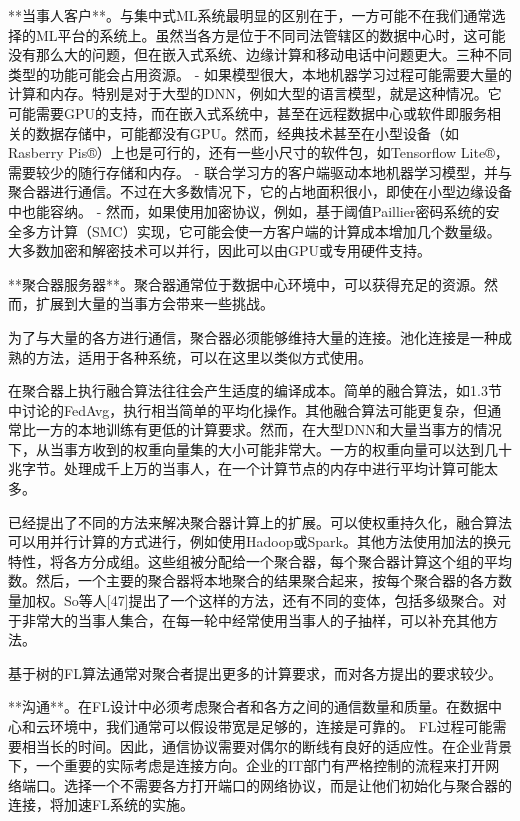 **当事人客户**。与集中式ML系统最明显的区别在于，一方可能不在我们通常选择的ML平台的系统上。虽然当各方是位于不同司法管辖区的数据中心时，这可能没有那么大的问题，但在嵌入式系统、边缘计算和移动电话中问题更大。三种不同类型的功能可能会占用资源。
- 如果模型很大，本地机器学习过程可能需要大量的计算和内存。特别是对于大型的DNN，例如大型的语言模型，就是这种情况。它可能需要GPU的支持，而在嵌入式系统中，甚至在远程数据中心或软件即服务相关的数据存储中，可能都没有GPU。然而，经典技术甚至在小型设备（如Rasberry Pis®）上也是可行的，还有一些小尺寸的软件包，如Tensorflow Lite®，需要较少的随行存储和内存。
- 联合学习方的客户端驱动本地机器学习模型，并与聚合器进行通信。不过在大多数情况下，它的占地面积很小，即使在小型边缘设备中也能容纳。
- 然而，如果使用加密协议，例如，基于阈值Paillier密码系统的安全多方计算（SMC）实现，它可能会使一方客户端的计算成本增加几个数量级。大多数加密和解密技术可以并行，因此可以由GPU或专用硬件支持。

**聚合器服务器**。聚合器通常位于数据中心环境中，可以获得充足的资源。然而，扩展到大量的当事方会带来一些挑战。

为了与大量的各方进行通信，聚合器必须能够维持大量的连接。池化连接是一种成熟的方法，适用于各种系统，可以在这里以类似方式使用。

在聚合器上执行融合算法往往会产生适度的编译成本。简单的融合算法，如1.3节中讨论的FedAvg，执行相当简单的平均化操作。其他融合算法可能更复杂，但通常比一方的本地训练有更低的计算要求。然而，在大型DNN和大量当事方的情况下，从当事方收到的权重向量集的大小可能非常大。一方的权重向量可以达到几十兆字节。处理成千上万的当事人，在一个计算节点的内存中进行平均计算可能太多。

已经提出了不同的方法来解决聚合器计算上的扩展。可以使权重持久化，融合算法可以用并行计算的方式进行，例如使用Hadoop或Spark。其他方法使用加法的换元特性，将各方分成组。这些组被分配给一个聚合器，每个聚合器计算这个组的平均数。然后，一个主要的聚合器将本地聚合的结果聚合起来，按每个聚合器的各方数量加权。So等人[47]提出了一个这样的方法，还有不同的变体，包括多级聚合。对于非常大的当事人集合，在每一轮中经常使用当事人的子抽样，可以补充其他方法。

基于树的FL算法通常对聚合者提出更多的计算要求，而对各方提出的要求较少。

**沟通**。在FL设计中必须考虑聚合者和各方之间的通信数量和质量。在数据中心和云环境中，我们通常可以假设带宽是足够的，连接是可靠的。
FL过程可能需要相当长的时间。因此，通信协议需要对偶尔的断线有良好的适应性。在企业背景下，一个重要的实际考虑是连接方向。企业的IT部门有严格控制的流程来打开网络端口。选择一个不需要各方打开端口的网络协议，而是让他们初始化与聚合器的连接，将加速FL系统的实施。

